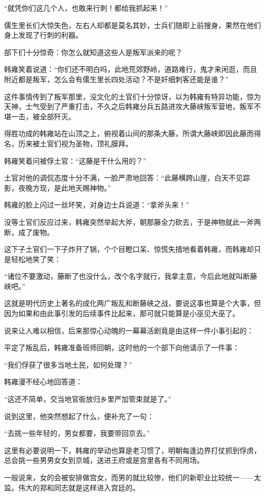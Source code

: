 \begin{multicols}{\theparacolNo}
		“就凭你们这几个人，也敢来行刺！都给我抓起来！”

		儒生里长们大惊失色，左右人却都是莫名其妙，士兵们随即上前搜身，果然在他们身上发现了行刺的利器。

		部下们十分惊奇：你怎么就知道这些人是叛军派来的呢？

		韩雍笑着说道：“你们还不明白吗，此地荒郊野岭，道路难行，鬼才来闲逛，而且附近都是叛军，怎么会有儒生里长四处活动？不是奸细刺客还能是谁？”

		这件事情传到了叛军那里，没文化的土官们十分惊讶，以为韩雍有特异功能，惊为天神，士气受到了严重打击，不久之后韩雍分兵五路进攻大藤峡叛军营地，叛军不堪一击，被全部歼灭。

		得胜功成的韩雍站在山顶之上，俯视着山间的那条大藤，所谓大藤峡即因此藤而得名，历来被土官们视为圣物，顶礼膜拜。

		韩雍笑着问被俘土官：“这藤是干什么用的？”

		土官对他的调侃态度十分不满，一脸严肃地回答：“此藤横跨山崖，白天不见踪影，夜晚方现，是此地天赐神物。”

		韩雍的脸上闪过一丝坏笑，对身边士兵说道：“拿斧头来！”

		没等土官们反应过来，韩雍突然举起大斧，朝那藤全力砍去，于是神物就此一斧两断，成了废物。

		这下子土官们一下子炸开了锅，个个目瞪口呆、惊慌失措地看着韩雍，而韩雍却只是轻松地笑了笑：

		“诸位不要激动，藤断了也没什么，改个名字就行，我拿主意，今后此地就叫断藤峡吧。”

		这就是明代历史上著名的成化两广叛乱和断藤峡之战，要说这事也算是个大事，但因为如果和由此事引发的后续事件比起来，那可就只能算是小巫见大巫了。

		说来让人难以相信，后来那惊心动魄的一幕幕活剧竟是由这样一件小事引起的：

		平定了叛乱后，韩雍准备班师回朝，这时他的一个部下向他请示了一件事：

		“我们俘获了很多当地土民，如何处理？”

		韩雍漫不经心地回答道：

		“这还不简单，交当地官衙放归乡里严加管束就是了。”

		说到这里，他突然想起了什么，便补充了一句：

		“去挑一些年轻的，男女都要，我要带回京去。”

		这里有必要说明一下，韩雍的举动也算是老习惯了，明朝每逢边界打仗抓到俘虏，总会挑一些男男女女到京城，送进王府或是宫里各有不同用场。

		一般说来，女的会被安排做宫女，而男的就比较惨，他们的新职业比较统一——太监。伟大的郑和同志就是这样进入宫廷的。


\end{multicols}
